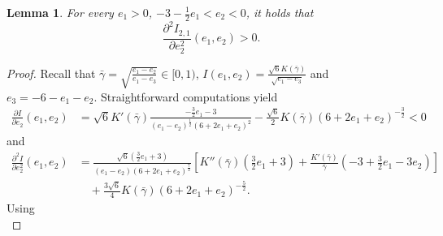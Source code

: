 \documentclass[reqno,12pt]{amsart}
\newtheorem{lemma}[theorem]{Lemma}
\begin{document}
{
\begin{lemma}\label{convexity}
For every $e_1>0$, $-3-\frac12 e_1 < e_2 <0$, it holds that 
\begin{equation}\label{convexity-1}
    \frac{\partial^2 I_{2, 1}}{\partial e_2^2} (e_1, e_2) >0. 
\end{equation}
\end{lemma}
\begin{proof}  
Recall that $\bar{\gamma}= \sqrt{\frac{e_1-e_2}{e_1-e_3}}\in [0,1)$, $I(e_1,e_2) = \frac{\sqrt{6}K(\bar{\gamma})}{\sqrt{e_1-e_3}}$ and $e_3=-6-e_1-e_2$. Straightforward computations  yield
\begin{equation}\label{eq:deriofIe2}
    \begin{aligned}
    \frac{\partial I }{\partial e_2}(e_1, e_2) 
    &= \sqrt{6}K'(\bar{\gamma})\frac{-\frac{3}{2}e_1-3}{(e_1-e_2)^{\frac{1}{2}}(6+2e_1+e_2)^{2}} - \frac{\sqrt{6}}{2}  K(\bar{\gamma})(6+2e_1+e_2)^{-\frac{3}{2}}<0
     \end{aligned}
    \end{equation}
   and
    \begin{equation*}
    \begin{aligned}
        \frac{\partial^2 I }{\partial e_2^2} (e_1, e_2) 
 &=  \frac{\sqrt{6}(\frac{3}{2}e_1+3)}{(e_1-e_2)(6+2e_1+e_2)^{\frac{7}{2}}} \left[K''(\bar{\gamma})\left(\frac{3}{2}e_1+3\right)  +  \frac{K'(\bar{\gamma})}{\bar{\gamma}} \left(-3+\frac{3}{2}e_1-3e_2\right)\right ]\\
       &\quad + \frac{3\sqrt{6}}{4}K(\bar{\gamma})(6+2e_1+e_2)^{-\frac{5}{2}}.
    \end{aligned}
\end{equation*}
Using
\begin{equation*}

\end{equation*}
\end{proof}}
\end{document}
